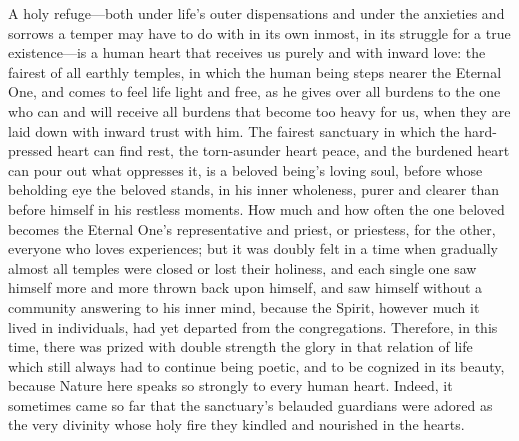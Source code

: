 \documentclass[12pt,a4paper]{book}
\begin{document}
A holy refuge---both under life's outer dispensations and under the
anxieties and sorrows a temper may have to do with in its own inmost, in
its struggle for a true existence---is a human heart that receives us purely
and with inward love: the fairest of all earthly temples, in which the
human being steps nearer the Eternal One, and comes to feel life light and
free, as he gives over all burdens to the one who can and will receive all
burdens that become too heavy for us, when they are laid down with inward
trust with him. The fairest sanctuary in which the hard-pressed heart can
find rest, the torn-asunder heart peace, and the burdened heart can pour
out what oppresses it, is a beloved being's loving soul, before whose
beholding eye the beloved stands, in his inner wholeness, purer and clearer
than before himself in his restless moments. How much and how often the one
beloved becomes the Eternal One's representative and priest, or priestess,
for the other, everyone who loves experiences; but it was doubly felt in a
time when gradually almost all temples were closed or lost their holiness,
and each single one saw himself more and more thrown back upon himself, and
saw himself without a community answering to his inner mind, because the
Spirit, however much it lived in individuals, had yet departed from the
congregations. Therefore, in this time, there was prized with double
strength the glory in that relation of life which still always had to
continue being poetic, and to be cognized in its beauty, because Nature
here speaks so strongly to every human heart. Indeed, it sometimes came so
far that the sanctuary's belauded guardians were adored as the very
divinity whose holy fire they kindled and nourished in the hearts.
\end{document}
